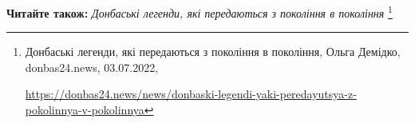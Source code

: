  
 
 
 
 

\textbf{Читайте також:} \emph{Донбаські легенди, які передаються з покоління в покоління}%
\footnote{Донбаські легенди, які передаються з покоління в покоління, Ольга Демідко, donbas24.news, 03.07.2022, \par%
\url{https://donbas24.news/news/donbaski-legendi-yaki-peredayutsya-z-pokolinnya-v-pokolinnya}%
}
